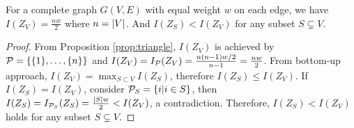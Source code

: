 \documentclass{article}
\begin{document}
\begin{corollary}\label{cor:complete}
	For a complete graph $G(V,E)$ with equal weight $w$ on each edge, we have $I(Z_{V})=\frac{nw}{2}$ where $n=\abs{V}$. And $I(Z_S) < I(Z_V)$ for any subset $S\subsetneq V$.
\end{corollary}
\begin{proof}
From Proposition \ref{prop:triangle}, $I(Z_{V})$ is achieved by $\P=\{\{1\},\dots,\{n\} \}$ and $I(Z_V) = I_{\P}(Z_V) = \frac{n(n-1)w/2}{n-1} = \frac{nw}{2} $. From bottom-up approach, $I(Z_V) = \max_{S\subset V} I(Z_S)$, therefore $I(Z_S) \leq I(Z_V)$. If $I(Z_S) = I(Z_V)$, consider $\P_S=\{i | i \in S\}$, then $I(Z_S) = I_{\P_S}(Z_S) = \frac{\abs{S}w}{2} < I(Z_V)$, a contradiction. Therefore, $I(Z_S) < I(Z_V)$ holds for any subset $S\subsetneq V$.
\end{proof}

\end{document}

